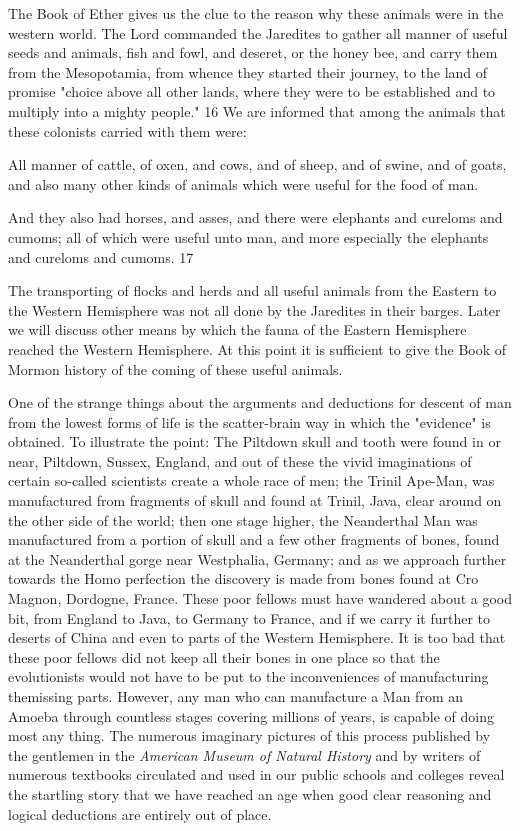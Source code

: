 The Book of Ether gives us the clue to the reason why these animals were in the western
world. The Lord commanded the Jaredites to gather all manner of useful seeds and animals,
fish and fowl, and deseret, or the honey bee, and carry them from the Mesopotamia, from
whence they started their journey, to the land of promise "choice above all other lands, where
they were to be established and to multiply into a mighty people." 16 We are informed that
among the animals that these colonists carried with them were:

All manner of cattle, of oxen, and cows, and of sheep, and of swine, and of goats, and also
many other kinds of animals which were useful for the food of man.

And they also had horses, and asses, and there were elephants and cureloms and cumoms; all
of which were useful unto man, and more especially the elephants and cureloms and
cumoms. 17

The transporting of flocks and herds and all useful animals from the Eastern to the Western
Hemisphere was not all done by the Jaredites in their barges. Later we will discuss other
means by which the fauna of the Eastern Hemisphere reached the Western Hemisphere. At
this point it is sufficient to give the Book of Mormon history of the coming of these useful
animals.

One of the strange things about the arguments and deductions for descent of man from the
lowest forms of life is the scatter-brain way in which the "evidence" is obtained. To illustrate
the point: The Piltdown skull and tooth were found in or near, Piltdown, Sussex, England,
and out of these the vivid imaginations of certain so-called scientists create a whole race of
men; the Trinil Ape-Man, was manufactured from fragments of skull and found at Trinil,
Java, clear around on the other side of the world; then one stage higher, the Neanderthal Man
was manufactured from a portion of skull and a few other fragments of bones, found at the
Neanderthal gorge near Westphalia, Germany; and as we approach further towards the Homo
perfection the discovery is made from bones found at Cro Magnon, Dordogne, France. These
poor fellows must have wandered about a good bit, from England to Java, to Germany to
France, and if we carry it further to deserts of China and even to parts of the Western
Hemisphere. It is too bad that these poor fellows did not keep all their bones in one place so
that the evolutionists would not have to be put to the inconveniences of manufacturing themissing parts. However, any man who can manufacture a Man from an Amoeba through
countless stages covering millions of years, is capable of doing most any thing. The
numerous imaginary pictures of this process published by the gentlemen in the \textit{American
Museum of Natural History} and by writers of numerous textbooks circulated and used in our
public schools and colleges reveal the startling story that we have reached an age when good
clear reasoning and logical deductions are entirely out of place.

